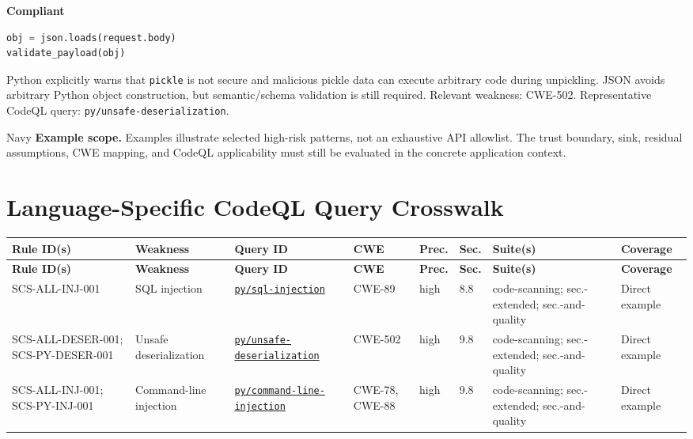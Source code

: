 \documentclass[10pt,letterpaper]{article}
\newcommand{\code}[1]{\texttt{\small #1}}
\begin{document}
\textbf{Compliant}\par
\begin{lstlisting}[language={Python}]
obj = json.loads(request.body)
validate_payload(obj)
\end{lstlisting}

Python explicitly warns that \code{pickle} is not secure and malicious pickle data can execute arbitrary code during unpickling. JSON avoids arbitrary Python object construction, but semantic/schema validation is still required. Relevant weakness: CWE-502. Representative CodeQL query: \code{py/unsafe-deserialization}.\par
\begin{callout}{Navy}
\textbf{Example scope.} Examples illustrate selected high-risk patterns, not an exhaustive API allowlist. The trust boundary, sink, residual assumptions, CWE mapping, and CodeQL applicability must still be evaluated in the concrete application context.
\end{callout}
\section{Language-Specific CodeQL Query Crosswalk}\begin{landscape}\scriptsize
\setlength{\tabcolsep}{2.6pt}
\begin{longtable}{@{}P{1.28in}P{1.12in}P{1.52in}P{0.78in}P{0.52in}P{0.48in}P{1.32in}P{0.82in}@{}}
\toprule
\textbf{Rule ID(s)} & \textbf{Weakness} & \textbf{Query ID} & \textbf{CWE} & \textbf{Prec.} & \textbf{Sec.} & \textbf{Suite(s)} & \textbf{Coverage}\\
\midrule
\endfirsthead
\toprule
\textbf{Rule ID(s)} & \textbf{Weakness} & \textbf{Query ID} & \textbf{CWE} & \textbf{Prec.} & \textbf{Sec.} & \textbf{Suite(s)} & \textbf{Coverage}\\
\midrule
\endhead
SCS-ALL-INJ-001 & SQL injection & \href{https://codeql.github.com/codeql-query-help/python/py-sql-injection/}{\code{py/sql-injection}} & CWE-89 & high & 8.8 & code-scanning; sec.-extended; sec.-and-quality & Direct example\\
SCS-ALL-DESER-001; SCS-PY-DESER-001 & Unsafe deserialization & \href{https://codeql.github.com/codeql-query-help/python/py-unsafe-deserialization/}{\code{py/unsafe-deserialization}} & CWE-502 & high & 9.8 & code-scanning; sec.-extended; sec.-and-quality & Direct example\\
SCS-ALL-INJ-001; SCS-PY-INJ-001 & Command-line injection & \href{https://codeql.github.com/codeql-query-help/python/py-command-line-injection/}{\code{py/command-line-injection}} & CWE-78, CWE-88 & high & 9.8 & code-scanning; sec.-extended; sec.-and-quality & Direct example\\
\bottomrule
\end{longtable}
\normalsize\end{landscape}
\end{document}
